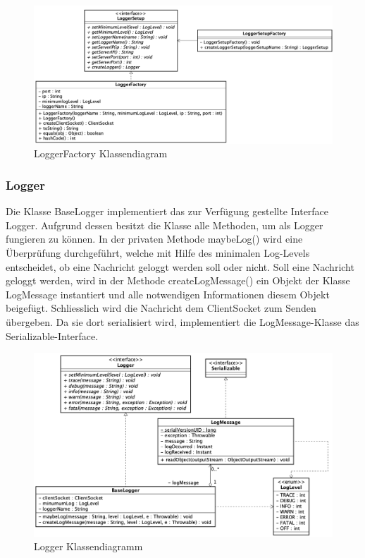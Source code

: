 \begin{figure}[H]
	\centering
	\includegraphics[width=\textwidth]{2_Architektur/Bilder/loggerFactory.png}
	\caption{LoggerFactory Klassendiagram}
	\label{fig:LoggerFactory Klassendiagramm}
\end{figure}

\newpage
\subsubsection{Logger}
Die Klasse BaseLogger implementiert das zur Verfügung gestellte Interface Logger. Aufgrund dessen besitzt die Klasse alle Methoden, um als Logger fungieren zu können. In der privaten Methode maybeLog() wird eine Überprüfung durchgeführt, welche mit Hilfe des minimalen Log-Levels entscheidet, ob eine Nachricht geloggt werden soll oder nicht. Soll eine Nachricht geloggt werden, wird in der Methode createLogMessage() ein Objekt der Klasse LogMessage instantiert und alle notwendigen Informationen diesem Objekt beigefügt. Schliesslich wird die Nachricht dem ClientSocket zum Senden übergeben. Da sie dort serialisiert wird, implementiert die LogMessage-Klasse das Serializable-Interface.

\begin{figure}[H]
	\centering
	\includegraphics[width=\textwidth]{2_Architektur/Bilder/loggerClasses.png}
	\caption{Logger Klassendiagramm}
	\label{fig:Logger Klassendiagramm}
\end{figure}


